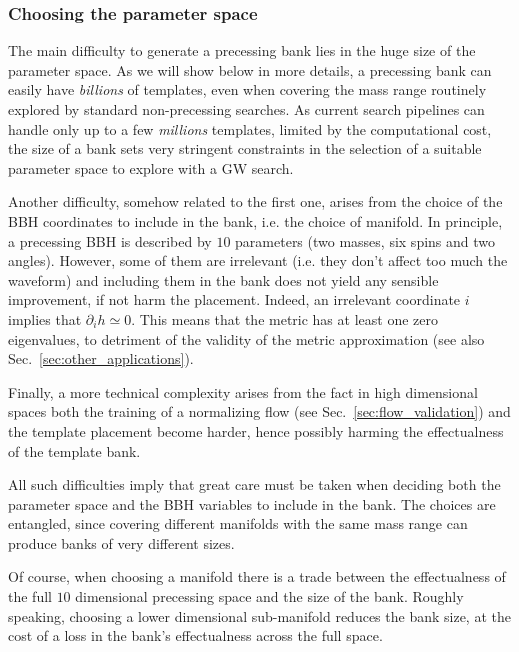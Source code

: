\documentclass[twocolumn,showpacs,preprintnumbers,nofootinbib,prd,
superscriptaddress,10pt]{revtex4-2}
\begin{document}
\subsubsection{Choosing the parameter space}

The main difficulty to generate a precessing bank lies in the huge size of the parameter space. As we will show below in more details, a precessing bank can easily have {\it billions} of templates, even when covering the mass range routinely explored by standard non-precessing searches. As current search pipelines can handle only up to a few {\it millions} templates, limited by the computational cost, the size of a bank sets very stringent constraints in the selection of a suitable parameter space to explore with a GW search.

Another difficulty, somehow related to the first one, arises from the choice of the BBH coordinates to include in the bank, i.e. the choice of manifold.
In principle, a precessing BBH is described by $10$ parameters (two masses, six spins and two angles). However, some of them are irrelevant (i.e. they don't affect too much the waveform) and including them in the bank does not yield any sensible improvement, if not harm the placement.
Indeed, an irrelevant coordinate $i$ implies that $\partial_i h \simeq 0$. This means that the metric has at least one zero eigenvalues, to detriment of the validity of the metric approximation (see also Sec.~\ref{sec:other_applications}).

Finally, a more technical complexity arises from the fact in high dimensional spaces both the training of a normalizing flow (see Sec.~\ref{sec:flow_validation}) and the template placement become harder, hence possibly harming the effectualness of the template bank.

All such difficulties imply that great care must be taken when deciding both the parameter space and the BBH variables to include in the bank.
The choices are entangled, since covering different manifolds with the same mass range can produce banks of very different sizes.

Of course, when choosing a manifold there is a trade between the effectualness of the full $10$ dimensional precessing space and the size of the bank. Roughly speaking, choosing a lower dimensional sub-manifold reduces the bank size, at the cost of a loss in the bank's effectualness across the full space.
\end{document}
